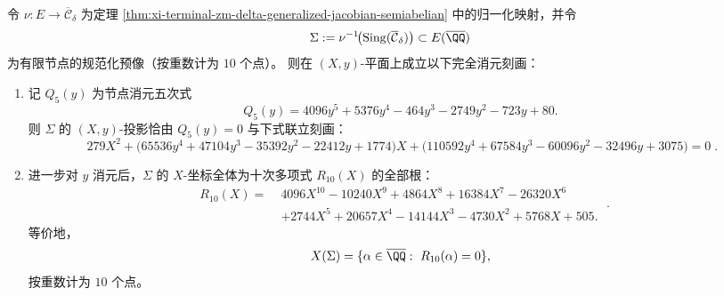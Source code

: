 \begin{theorem}[节点预像的二次中介式与十次消元]\label{thm:xi-terminal-zm-delta-node-preimage-elimination-r10}
令 \(\nu:E\to\overline{\mathcal C}_\delta\) 为定理 \ref{thm:xi-terminal-zm-delta-generalized-jacobian-semiabelian} 中的归一化映射，并令
\[
\Sigma:=\nu^{-1}\!\bigl(\mathrm{Sing}(\overline{\mathcal C}_\delta)\bigr)\subset E(\overline{\QQ})
\]
为有限节点的规范化预像（按重数计为 \(10\) 个点）。
则在 \((X,y)\)-平面上成立以下完全消元刻画：
\begin{enumerate}
  \item 记 \(Q_5(y)\) 为节点消元五次式
  \[
  Q_{5}(y)=4096y^{5}+5376y^{4}-464y^{3}-2749y^{2}-723y+80.
  \]
  则 \(\Sigma\) 的 \((X,y)\)-投影恰由 \(Q_5(y)=0\) 与下式联立刻画：
  \begin{equation}\label{eq:xi-terminal-zm-delta-node-preimage-quadratic-mediator}
  \boxed{\;
  279X^{2}+\bigl(65536y^{4}+47104y^{3}-35392y^{2}-22412y+1774\bigr)X
  +\bigl(110592y^{4}+67584y^{3}-60096y^{2}-32496y+3075\bigr)=0\; } .
  \end{equation}
  \item 进一步对 \(y\) 消元后，\(\Sigma\) 的 \(X\)-坐标全体为十次多项式 \(R_{10}(X)\) 的全部根：
  \begin{equation}\label{eq:xi-terminal-zm-delta-node-preimage-r10}
  \boxed{\;
  \begin{aligned}
  R_{10}(X)=\;&4096X^{10}-10240X^{9}+4864X^{8}+16384X^{7}-26320X^{6}\\
  &+2744X^{5}+20657X^{4}-14144X^{3}-4730X^{2}+5768X+505.
  \end{aligned}\; } .
  \end{equation}
  等价地，
  \[
  X(\Sigma)=\{\alpha\in\overline{\QQ}:\ R_{10}(\alpha)=0\},
  \]
  按重数计为 \(10\) 个点。
\end{enumerate}
\end{theorem}

